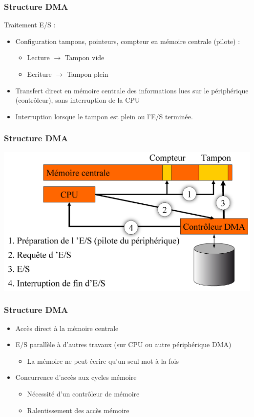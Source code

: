 \begin{frame}
\frametitle{Structure DMA}
Traitement E/S :
\begin{itemize}
\item Configuration tampons, pointeurs, compteur en mémoire centrale (pilote) :
\begin{itemize}
\item Lecture $\rightarrow$ Tampon vide 
\item Ecriture $\rightarrow$ Tampon plein
\end{itemize}
\item Transfert direct en mémoire centrale des informations lues sur le périphérique (contrôleur), sans interruption de la CPU
\item Interruption lorsque le tampon est plein ou l’E/S terminée.
\end{itemize}
\end{frame}


\begin{frame}
\frametitle{Structure DMA}
\includegraphics[width=\textwidth]{../illustration/traitement_DMA.png}
\end{frame}


\begin{frame}
\frametitle{Structure DMA}
\begin{itemize}
\item Accès direct à la mémoire centrale
\item E/S parallèle à d’autres travaux (sur CPU ou autre périphérique DMA)
\begin{itemize}
\item La mémoire ne peut écrire qu’un seul mot à la fois
\end{itemize}
\item Concurrence d’accès aux cycles mémoire
\begin{itemize}
\item Nécessité d’un contrôleur de mémoire
\item Ralentissement des accès mémoire
\end{itemize}
\end{itemize}
\end{frame}

